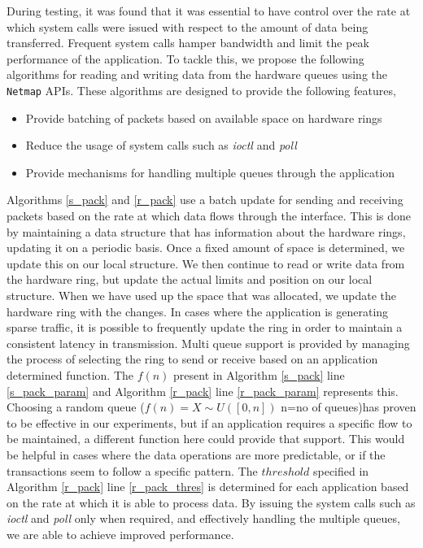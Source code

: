 \documentclass[10pt, conference, compsocconf, reqno]{IEEEtran}
\newcommand{\comment}[1]{}
\begin{document}
During testing, it was found that it was essential to have control over the rate at which system calls were issued with respect to the amount of data being transferred. Frequent system calls hamper bandwidth and limit the peak performance of the application. To tackle this, we propose the following algorithms for reading and writing data from the hardware queues using the \texttt{Netmap} APIs. These algorithms are designed to provide the following features,

\begin{itemize}

\item Provide batching of packets based on available space on hardware rings
\item Reduce the usage of system calls such as \textit{ioctl} and \textit {poll}
\item Provide mechanisms for handling multiple queues through the application

\end{itemize}

\comment{By minimizing the synchronizations with the hardware rings, we essentially limit the system calls issued and consequently improve the overall system performance.}










Algorithms \ref{s_pack} and \ref{r_pack} use a batch update for sending and receiving packets based on the rate at which data flows through the interface. This is done by maintaining a data structure that has information about the hardware rings, updating it on a periodic basis. Once a fixed amount of space is determined, we update this on our local structure. We then continue to read or write data from the hardware ring, but update the actual limits and position on our local structure. When we have used up the space that was allocated, we update the hardware ring with the changes. In cases where the application is generating sparse traffic, it is possible to frequently update the ring in order to maintain a consistent latency in transmission. Multi queue support is provided by managing the process of selecting the ring to send or receive based on an application determined function. The $f(n)$ present in Algorithm \ref{s_pack} line \ref{s_pack_param} and Algorithm \ref{r_pack} line \ref{r_pack_param} represents this. Choosing a random queue ($f(n)=X \sim U([0,n])$ n=no of queues)has proven to be effective in our experiments, but if an application requires a specific flow to be maintained, a different function here could provide that support. This would be helpful in cases where the data operations are more predictable, or if the transactions seem to follow a specific pattern. The $threshold$ specified in Algorithm \ref{r_pack} line \ref{r_pack_thres} is determined for each application based on the rate at which it is able to process data. By issuing the system calls such as \textit{ioctl} and \textit{poll} only when required, and effectively handling the multiple queues, we are able to achieve improved performance.
\end{document}
